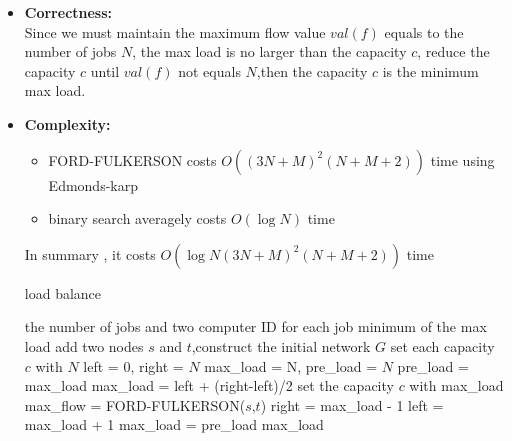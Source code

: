 \begin{itemize}
	\item \textbf{Correctness:} \\
		 Since we must maintain the maximum flow value $val(f)$ equals to the number of jobs $N$,
		 the max load is no larger than the capacity $c$, reduce the capacity $c$ until $val(f)$ not 
		 equals $N$,then the capacity $c$ is the minimum max load.
	\item \textbf{Complexity:} 
		\begin{itemize}
			\item FORD-FULKERSON costs $O((3N+M)^2(N+M+2))$ time using Edmonds-karp
			\item binary search averagely costs $O(\log N)$ time
		\end{itemize}
		In summary , it costs $O(\log N (3N+M)^2(N+M+2))$ time
		\begin{algorithm}[H]
			\caption{load balance}
			\begin{algorithmic}[1]
				\Require  the number of jobs and two computer ID for each job 
				\Ensure   minimum of the max load	
				 {}
				\State add two nodes $s$ and $t$,construct the initial network $G$ 
				\State set each capacity $c$  with $N$
				\State left = $0$, right = $N$
				\State max\_load = N, pre\_load = $N$
				\State pre\_load = max\_load
				\State max\_load = left + (right-left)/2
				\State set the capacity $c$ with max\_load 
				\State max\_flow = FORD-FULKERSON($s$,$t$)
				\State right = max\_load - 1
				\Else
				\State left = max\_load + 1
				\EndIf 	
				\State max\_load = pre\_load
				\EndIf	  
				\EndWhile
				\State \Return max\_load 				 
				\EndFunction 
			\end{algorithmic} 
		\end{algorithm}	
\end{itemize}
 